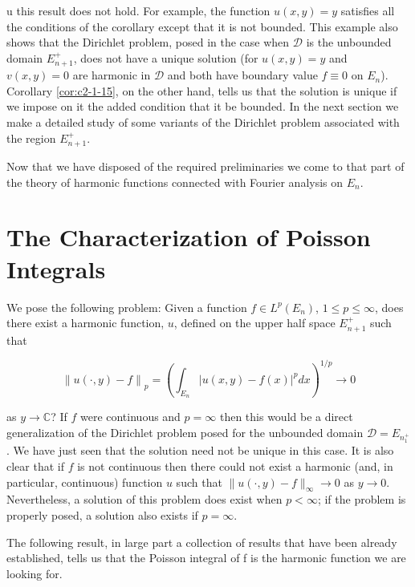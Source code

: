 u this result does not hold. For example, the function $u(x, y) = y$ satisfies all the conditions of the corollary except that it is not bounded. This example also shows that the Dirichlet problem, posed in the case when $\mathcal{D}$ is the unbounded domain $E_{n+1}^+$, does not have a unique solution (for $u(x, y) = y$ and $v(x, y) = 0$ are harmonic in $\mathcal{D}$ and both have boundary value $f \equiv 0$ on $E_n$). Corollary \ref{cor:c2-1-15}, on the other hand, tells us that the solution is unique if we impose on it the added condition that it be bounded. In the next section we make a detailed study of some variants of the Dirichlet problem associated with the region $E_{n+1}^+$.

Now that we have disposed of the required preliminaries we come to that part of the theory of harmonic functions connected with Fourier analysis on $E_{n}$.

\section{The Characterization of Poisson Integrals}

We pose the following problem: Given a function $f \in L^p(E_n)$, $1 \leq p \leq \infty$, does there exist a harmonic function, $u$, defined on the upper half space $E_{n+1}^+$ such that

\[
\left\|u(\cdot,y)-f\right\|_{p}=\left(\int_{E_{n}}\left|u(x,y)-f(x)\right|^{p}d x\right)^{1/p}\to0
\]

as $y \to \mathbb{C}$? If $f$ were continuous and $p = \infty$ then this would be a direct generalization of the Dirichlet problem posed for the unbounded domain $\mathcal{D} = E_{n^+_1}$. We have just seen that the solution need not be unique in this case. It is also clear that if $f$ is not continuous then there could not exist a harmonic (and, in particular, continuous) function $u$ such that $\|u(\cdot, y) - f\|_\infty \to 0$ as $y \to 0$. Nevertheless, a solution of this problem does exist when $p < \infty$; if the problem is properly posed, a solution also exists if $p = \infty$.

The following result, in large part a collection of results that have been already established, tells us that the Poisson integral of f is the harmonic function we are looking for.

